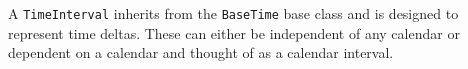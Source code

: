 
A {\tt TimeInterval} inherits from the {\tt BaseTime} base class and is
designed to represent time deltas. These can either be independent of
any calendar or dependent on a calendar and thought of as a calendar
interval.
